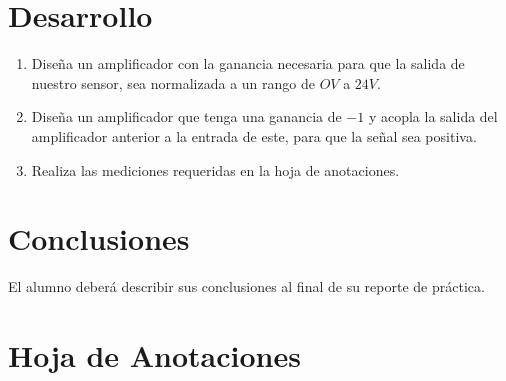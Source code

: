 
\section{Desarrollo}
	
	\begin{enumerate}
		\item Diseña un amplificador con la ganancia necesaria para que la salida de nuestro sensor, sea normalizada a un rango de $OV$ a $24V$.
		\item Diseña un amplificador que tenga una ganancia de $-1$ y acopla la salida del amplificador anterior a la entrada de este, para que la señal sea positiva.
		\item Realiza las mediciones requeridas en la hoja de anotaciones.
	\end{enumerate}



\section{Conclusiones}

	El alumno deberá describir sus conclusiones al final de su reporte de práctica.
    

\clearpage
\section{Hoja de Anotaciones}
	

